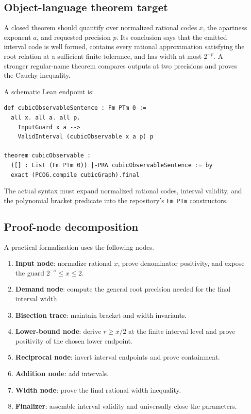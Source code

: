 \subsection{Object-language theorem target}

A closed theorem should quantify over normalized rational codes \(x\), the
apartness exponent \(a\), and requested precision \(p\).  Its conclusion says
that the emitted interval code is well formed, contains every rational
approximation satisfying the root relation at a sufficient finite tolerance,
and has width at most \(2^{-p}\).  A stronger regular-name theorem compares
outputs at two precisions and proves the Cauchy inequality.

A schematic Lean endpoint is:

\begin{lstlisting}[language={}]
def cubicObservableSentence : Fm PTm 0 :=
  all x. all a. all p.
    InputGuard x a -->
    ValidInterval (cubicObservable x a p) p

theorem cubicObservable :
  ([] : List (Fm PTm 0)) |-PRA cubicObservableSentence := by
  exact (PCOG.compile cubicGraph).final
\end{lstlisting}

The actual syntax must expand normalized rational codes, interval validity, and
the polynomial bracket predicate into the repository's \texttt{Fm PTm}
constructors.

\subsection{Proof-node decomposition}

A practical formalization uses the following nodes.

\begin{enumerate}
\item \textbf{Input node}: normalize rational \(x\), prove denominator
positivity, and expose the guard \(2^{-a}\leq x\leq2\).
\item \textbf{Demand node}: compute the general root precision needed for the
final interval width.
\item \textbf{Bisection trace}: maintain bracket and width invariants.
\item \textbf{Lower-bound node}: derive \(r\geq x/2\) at the finite interval
level and prove positivity of the chosen lower endpoint.
\item \textbf{Reciprocal node}: invert interval endpoints and prove
containment.
\item \textbf{Addition node}: add intervals.
\item \textbf{Width node}: prove the final rational width inequality.
\item \textbf{Finalizer}: assemble interval validity and universally close the
parameters.
\end{enumerate}

